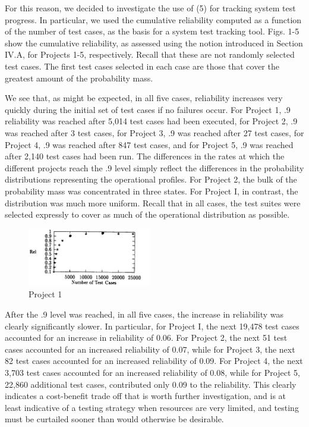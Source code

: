 \documentclass[journal, twoside]{IEEEtran}
\begin{document}
For this reason, we decided to investigate the use of (5) for
tracking system test progress. In particular, we used the cumulative reliability computed as a function of the number of test
cases, as the basis for a system test tracking tool. Figs. 1-5
show the cumulative reliability, as assessed using the notion
introduced in Section IV.A, for Projects 1-5, respectively. Recall that these are not randomly selected test cases. The first
test cases selected in each case are those that cover the greatest
amount of the probability mass. 

We see that, as might be expected, in all five cases, reliability increases very quickly during the initial set of test cases if
no failures occur. For Project 1, .9 reliability was reached after
5,014 test cases had been executed, for Project 2, .9 was
reached after 3 test cases, for Project 3, .9 was reached after 27
test cases, for Project 4, .9 was reached after 847 test cases,
and for Project 5, .9 was reached after 2,140 test cases had
been run. The differences in the rates at which the different
projects reach the .9 level simply reflect the differences in the
probability distributions representing the operational profiles.
For Project 2, the bulk of the probability mass was concentrated in three states. For Project I, in contrast, the distribution
was much more uniform. Recall that in all cases, the test suites
were selected expressly to cover as much of the operational
distribution as possible. 

\begin{figure}[ht]
    \centering
    \includegraphics[width=0.48\textwidth, height= 0.2\textwidth]{figure1.PNG}
    \caption{ Project 1}
    
\end{figure}

After the .9 level was reached, in all five cases, the increase in reliability was clearly significantly slower. In particular, for Project I, the next 19,478 test cases accounted for an increase in reliability of 0.06. For Project 2, the next 51 test cases accounted for an increased reliability of 0.07, while for Project 3, the next 82 test cases accounted for an increased reliability of 0.09. For Project 4, the next 3,703 test cases accounted for an increased reliability of 0.08, while for Project 5, 22,860 additional test cases, contributed only 0.09 to the reliability. This clearly indicates a cost-benefit trade off that is worth further investigation, and is at least indicative of a testing strategy when resources are very limited, and testing must be curtailed sooner than would otherwise be desirable. 
\end{document}
